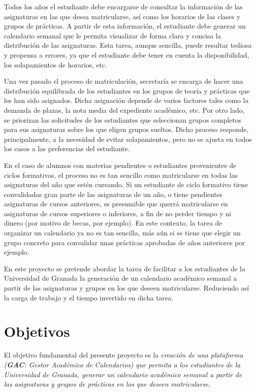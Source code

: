 Todos los años el estudiante debe encargarse de consultar la información de las asignaturas en las que desea matricularse, así como los horarios de las clases y grupos de prácticas. A partir de esta información, el estudiante debe generar un calendario semanal que le permita visualizar de forma clara y concisa la distribución de las asignaturas. Esta tarea, aunque sencilla, puede resultar tediosa y propensa a errores, ya que el estudiante debe tener en cuenta la disponibilidad, los solapamientos de horarios, etc.\newline

Una vez pasado el proceso de matriculación, secretaría se encarga de hacer una distribución equilibrada de los estudiantes en los grupos de teoría y prácticas que les han sido asignados. Dicha asignación depende de varios factores tales como la demanda de plazas, la nota media del expediente académico, etc. Por otro lado, se priorizan las solicitudes de los estudiantes que seleccionan grupos completos para sus asignaturas sobre los que eligen grupos sueltos. Dicho proceso responde, principalmente, a la necesidad de evitar solapamientos, pero no se ajusta en todos los casos a las preferencias del estudiante.\newline

En el caso de alumnos con materias pendientes o estudiantes provenientes de ciclos formativos, el proceso no es tan sencillo como matricularse en todas las asignaturas del año que estén cursando.
Si un estudiante de ciclo formativo tiene convalidadas gran parte de las asignaturas de un año, o tiene pendientes asignaturas de cursos anteriores, es presumible que querrá matricularse en asignaturas de cursos superiores o inferiores, a fin de no perder tiempo y ni dinero (por motivo de becas, por ejemplo). En este contexto, la tarea de organizar un calendario ya no es tan sencilla, más aún si se tiene que elegir un grupo concreto para convalidar unas prácticas aprobadas de años anteriores por ejemplo.\newline

En este proyecto se pretende abordar la tarea de facilitar a los estudiantes de la Universidad de Granada la generación de un calendario académico semanal a partir de las asignaturas y grupos en los que deseen matricularse. Reduciendo así la carga de trabajo y el tiempo invertido en dicha tarea.


\section{Objetivos}
El objetivo fundamental del presente proyecto es la \textit{creación de una plataforma (\textbf{GAC}: Gestor Académico de Calendarios) que permita a los estudiantes de la Universidad de Granada, generar un calendario académico semanal a partir de las asignaturas y grupos de prácticas en los que deseen matricularse.}\newline

